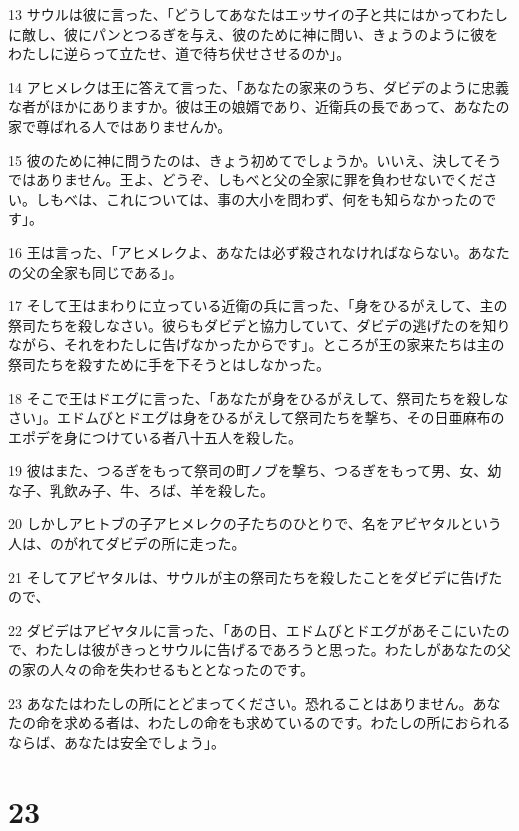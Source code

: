 \par 13 サウルは彼に言った、「どうしてあなたはエッサイの子と共にはかってわたしに敵し、彼にパンとつるぎを与え、彼のために神に問い、きょうのように彼をわたしに逆らって立たせ、道で待ち伏せさせるのか」。
\par 14 アヒメレクは王に答えて言った、「あなたの家来のうち、ダビデのように忠義な者がほかにありますか。彼は王の娘婿であり、近衛兵の長であって、あなたの家で尊ばれる人ではありませんか。
\par 15 彼のために神に問うたのは、きょう初めてでしょうか。いいえ、決してそうではありません。王よ、どうぞ、しもべと父の全家に罪を負わせないでください。しもべは、これについては、事の大小を問わず、何をも知らなかったのです」。
\par 16 王は言った、「アヒメレクよ、あなたは必ず殺されなければならない。あなたの父の全家も同じである」。
\par 17 そして王はまわりに立っている近衛の兵に言った、「身をひるがえして、主の祭司たちを殺しなさい。彼らもダビデと協力していて、ダビデの逃げたのを知りながら、それをわたしに告げなかったからです」。ところが王の家来たちは主の祭司たちを殺すために手を下そうとはしなかった。
\par 18 そこで王はドエグに言った、「あなたが身をひるがえして、祭司たちを殺しなさい」。エドムびとドエグは身をひるがえして祭司たちを撃ち、その日亜麻布のエポデを身につけている者八十五人を殺した。
\par 19 彼はまた、つるぎをもって祭司の町ノブを撃ち、つるぎをもって男、女、幼な子、乳飲み子、牛、ろば、羊を殺した。
\par 20 しかしアヒトブの子アヒメレクの子たちのひとりで、名をアビヤタルという人は、のがれてダビデの所に走った。
\par 21 そしてアビヤタルは、サウルが主の祭司たちを殺したことをダビデに告げたので、
\par 22 ダビデはアビヤタルに言った、「あの日、エドムびとドエグがあそこにいたので、わたしは彼がきっとサウルに告げるであろうと思った。わたしがあなたの父の家の人々の命を失わせるもととなったのです。
\par 23 あなたはわたしの所にとどまってください。恐れることはありません。あなたの命を求める者は、わたしの命をも求めているのです。わたしの所におられるならば、あなたは安全でしょう」。

\chapter{23}

